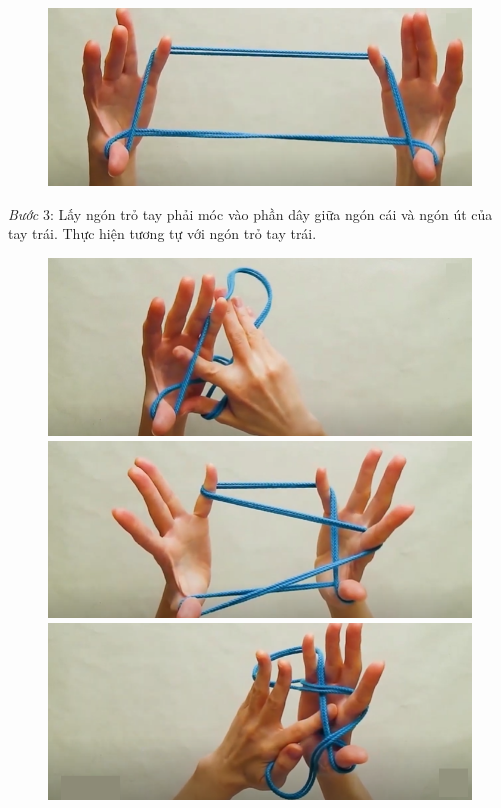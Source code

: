 \begin{multicols}{2}
\begin{figure}[H]
		\vspace*{1pt}
		\includegraphics[width=0.98\linewidth]{2b}
		\vspace*{-15pt}
	\end{figure}
	\textit{Bước} $3$: Lấy ngón trỏ tay phải móc vào phần dây giữa ngón cái và ngón út của tay trái. Thực hiện tương tự với ngón trỏ tay trái.
	\begin{figure}[H]
		\vspace*{-10pt}
		\centering
		\captionsetup{labelformat= empty, justification=centering}
		\includegraphics[width=0.98\linewidth]{3a}
		
		\vspace*{1pt}
		\includegraphics[width=0.98\linewidth]{3b}
		
		\vspace*{1pt}
		\includegraphics[width=0.98\linewidth]{3c}
		

\end{figure}
\end{multicols}
